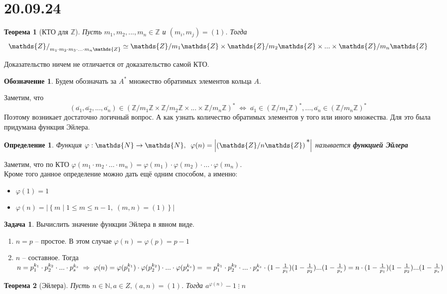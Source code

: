 \documentclass[12pt, a4paper]{article}
\newcommand{\nat}{\mathds{N}}
\newcommand{\lra}{\Leftrightarrow}
\newcommand{\ra}{\;\Rightarrow\;}
\newcommand{\Z}{\mathds{Z}}
\newcommand{\m}{\leqslant}
\newcommand{\cl}[1]{\overline{#1}}
\theoremstyle{plain}
\newtheorem*{Th*}{Теорема}
\newtheorem{Def}{Определение}
\theoremstyle{definition}
\newtheorem*{Designation*}{Обозначение}
\newtheorem*{Problem*}{Задача}
\begin{document}
\section*{20.09.24}
\begin{Th*}[КТО для $\Z$]
    Пусть $m_1,m_2,...,m_n\in\Z$ и $(m_i,m_j) = (1)$. Тогда 
    \[\Z\raisebox{-.1ex}{$/$}_{m_1\cdot m_2\cdot m_3\cdot...\cdot m_n\Z}\simeq\Z/m_1\Z\times\Z/m_2\Z\times...\times\Z/m_n\Z\]
\end{Th*}
\noindent Доказательство ничем не отличается от доказательство самой КТО.
\begin{Designation*}
Будем обозначать за $A^{*}$ множество обратимых элементов кольца $A$.
\end{Designation*}
\noindent Заметим, что \[(\cl{a_1},\cl{a_2},...,\cl{a_n})\in (\Z/m_1\Z\times\Z/m_2\Z\times...\times\Z/m_n\Z)^{*} \;\lra\; \cl{a_1}\in (\Z/m_1\Z)^{*}, ..., \cl{a_n}\in (\Z/m_n\Z)^{*} \]
Поэтому возникает достаточно логичный вопрос. А как узнать количество обратимых элементов у того или иного множества. Для это была придумана функция Эйлера.
\begin{Def}
    Функция $\varphi:\nat\to\nat,\;\; \varphi(n) = \left|\left(\Z/n\Z\right)\raisebox{1ex}{*}\right|$ называется \textbf{функцией Эйлера}
\end{Def}
\noindent Заметим, что по КТО $\varphi(m_1\cdot m_2\cdot...\cdot m_n) = \varphi(m_1)\cdot\varphi(m_2)\cdot...\cdot \varphi(m_n)$.
\\
Кроме того данное определение можно дать ещё одним способом, а именно:
\begin{itemize}
    \item $\varphi(1) = 1$
    \item $\varphi(n) = \big|\left\{m\;|\;1\m m \m n-1,\; (m,n) = (1)\right\}\big|$
\end{itemize}
\begin{Problem*}
    Вычислить значение функции Эйлера в явном виде.
\end{Problem*}
\begin{enumerate}
    \item $n = p$ -- простое. В этом случае $\varphi(n) = \varphi (p) = p-1$
    \item $n$ -- составное. Тогда $n = p_1^{k_1}\cdot p_2^{k_2}\cdot...\cdot p_s^{k_s} \ra \varphi(n) = \varphi(p_1^{k_1})\cdot \varphi(p_2^{k_2})\cdot...\cdot \varphi(p_s^{k_s}) = \\ = p_1^{k_1}\cdot p_2^{k_2}\cdot...\cdot p_s^{k_s}\cdot(1 - \frac{1}{p_1})(1 - \frac{1}{p_2})...(1-\frac{1}{p_s}) = n\cdot(1 - \frac{1}{p_1})(1 - \frac{1}{p_2})...(1-\frac{1}{p_s})$ 
\end{enumerate}
\begin{Th*}[Эйлера]
    Пусть $n\in\nat, a\in Z, (a,n) = (1)$. Тогда $a^{\varphi(n)}-1\;\vdots\;n$
\end{Th*}
\end{document}
